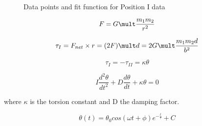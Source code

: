 \documentclass[twoside,twocolumn]{article}
\begin{document}
\begin{figure}[H]
\centering
  \begin{center}
  \end{center}
  \caption{Data points and fit function for Position I data}
\end{figure}
\label{fig:geometry}

\begin{equation}
\label{eq:attraction}
F = G \mult \frac{m_{1}m_{2}}{r^2}
\end{equation}

\begin{equation}
\label{eq:torque}
\tau_{I} = F_{net} \times r = (2F) \mult d = 2G \mult \frac{m_{1}m_{2}d}{b^2}
\end{equation}

\begin{equation}
\label{eq:pos_torque}
\tau_{I} = -\tau_{II} = \kappa \theta
\end{equation}

\begin{equation}
\label{eq:diff_eq}
  I\frac{d^2\theta}{dt^2} + D\frac{d\theta}{dt} + \kappa \theta = 0
\end{equation}

where $\kappa$ is the torsion constant and D the damping factor.

\begin{equation}
\label{eq:diff_sol}
\theta(t) = \theta_{0}cos(\omega t + \phi)e^{-\frac{t}{\tau}} + C
\end{equation}
\end{document}
